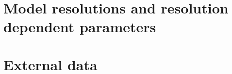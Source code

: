 \documentclass[DIV14,BCOR1cm,11pt,a4paper,twoside]{scrreprt}
\begin{document}



\chapter{Model resolutions and resolution dependent parameters}


\chapter{External data}












\end{document}
